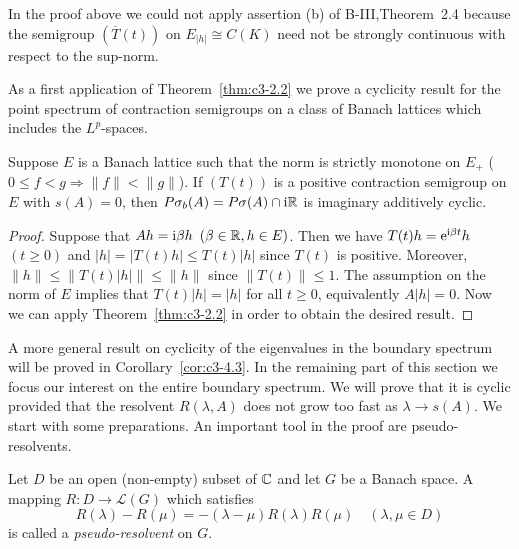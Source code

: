 In the proof above we could not apply assertion (b) of B-III,Theorem~2.4 because the semigroup $(\overline{T}(t))$ on $E_{|h|} \cong C(K)$ need not be strongly continuous with respect to the sup-norm.

As a first application of Theorem~\ref{thm:c3-2.2} we prove a cyclicity result for the point spectrum of contraction semigroups on a class of Banach lattices which includes the $L^p$-spaces.

\begin{corollary}\label{cor:c3-2.3}
	Suppose $E$ is a Banach lattice such that the norm is strictly monotone on $E_{+}$ (\ie  $0 \leq f < g \Rightarrow \|f\| < \|g\|$).
	If $(T(t))$ is a positive contraction semigroup on $E$ with $s(A) = 0$, then $P\sigma_{b}(A) = P\sigma(A) \cap \mathrm{i}\mathbb{R} $ is imaginary additively cyclic.
\end{corollary}

\begin{proof}
	Suppose that $Ah = \mathrm{i}\beta  h$ $(\beta \in \mathbb{R} , h \in E)$.
	Then we have $T(t)h = \mathrm{e}^{\mathrm{i}\beta  t}h$ $(t \geq 0)$ and $|h| = |T(t)h| \leq T(t)|h|$ since $T(t)$ is positive.
	Moreover, $\|h\| \leq \|T(t)|h|\| \leq \|h\|$ since $\|T(t)\| \leq 1$.
	The assumption on the norm of $E$ implies that $T(t)|h| = |h|$ for all $t \geq 0$, equivalently $A|h| = 0$.
	Now we can apply Theorem~\ref{thm:c3-2.2} in order to obtain the desired result.
\end{proof}
%
A more general result on cyclicity of the eigenvalues in the boundary spectrum will be proved in Corollary~\ref{cor:c3-4.3}.
In the remaining part of this section we focus our interest on the entire boundary spectrum.
We will prove that it is cyclic provided that the resolvent $R(\lambda,A)$ does not grow too fast as $\lambda \to s(A)$.
We start with some preparations.
An important tool in the proof are pseudo-resolvents.

\begin{definition}\label{def:c3-2.4}
	Let $D$ be an open (non-empty) subset of $\mathbb{C} $ and let $G$ be a Banach space.
	A mapping $R \colon D \to \mathcal{L}(G)$ which satisfies
	\begin{equation}\label{eq:c3-2.8}
		R(\lambda) - R(\mu) = -(\lambda - \mu)R(\lambda)R(\mu) \quad (\lambda,\mu \in D)
	\end{equation}
	is called a \emph{pseudo-resolvent} on $G$.
\end{definition}

